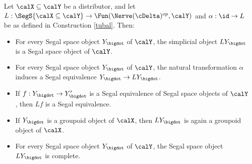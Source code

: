 \begin{proposition}\label{mainwork}
Let $\calX \subseteq \calY$ be a distributor, and let $L: \SegS{ \calX \subseteq \calY}
\rightarrow \Fun( \Nerve(\cDelta)^{op}, \calY)$ and $\alpha: \id \rightarrow L$ be as defined
in Construction \ref{tubal}. Then:
\begin{itemize}
\item[$(1)$] For every Segal space object $Y_{\bigdot}$ of $\calY$, the simplicial object
$LY_{\bigdot}$ is a Segal space object of $\calY$.
\item[$(2)$] For every Segal space object $Y_{\bigdot}$ of $\calY$, the natural transformation
$\alpha$ induces a Segal equivalence $Y_{\bigdot} \rightarrow LY_{\bigdot}$.
\item[$(3)$] If $f: Y_{\bigdot} \rightarrow Y'_{\bigdot}$ is a Segal equivalence of Segal
space objects of $\calY$, then $Lf$ is a Segal equivalence.
\item[$(4)$] If $Y_{\bigdot}$ is a groupoid object of $\calX$, then $L Y_{\bigdot}$ is again a groupoid object
of $\calX$.
\item[$(5)$] For every Segal space object $Y_{\bigdot}$ of $\calY$, the Segal space object
$LY_{\bigdot}$ is complete.
\end{itemize}
\end{proposition}

